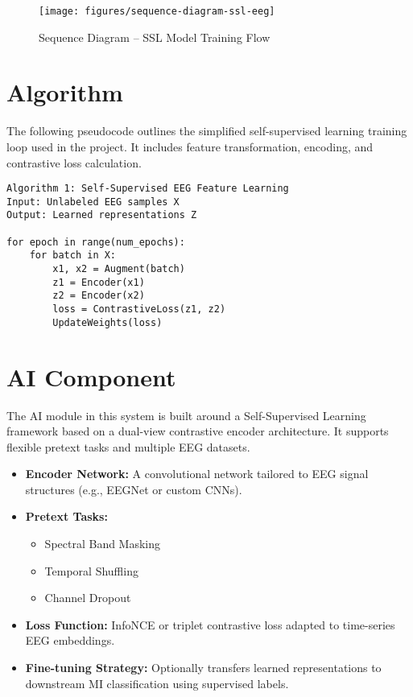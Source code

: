 \begin{figure}[H]
    \centering
    \texttt{[image: figures/sequence-diagram-ssl-eeg]}
    \caption{Sequence Diagram – SSL Model Training Flow}
    \label{fig:figure8}
\end{figure}

\section{Algorithm}
\label{sec:algorithm}

The following pseudocode outlines the simplified self-supervised learning training loop used in the project.
It includes feature transformation, encoding, and contrastive loss calculation.

\begin{verbatim}
Algorithm 1: Self-Supervised EEG Feature Learning
Input: Unlabeled EEG samples X
Output: Learned representations Z

for epoch in range(num_epochs):
    for batch in X:
        x1, x2 = Augment(batch)
        z1 = Encoder(x1)
        z2 = Encoder(x2)
        loss = ContrastiveLoss(z1, z2)
        UpdateWeights(loss)
\end{verbatim}

\section{AI Component}
\label{sec:ai-component}

The AI module in this system is built around a Self-Supervised Learning framework based on a dual-view contrastive encoder architecture.
It supports flexible pretext tasks and multiple EEG datasets.

\begin{itemize}
    \item \textbf{Encoder Network:} A convolutional network tailored to EEG signal structures (e.g., EEGNet or custom CNNs).
    \item \textbf{Pretext Tasks:}
    \begin{itemize}
        \item Spectral Band Masking
        \item Temporal Shuffling
        \item Channel Dropout
    \end{itemize}
    \item \textbf{Loss Function:} InfoNCE or triplet contrastive loss adapted to time-series EEG embeddings.
    \item \textbf{Fine-tuning Strategy:} Optionally transfers learned representations to downstream MI classification using supervised labels.
\end{itemize}

